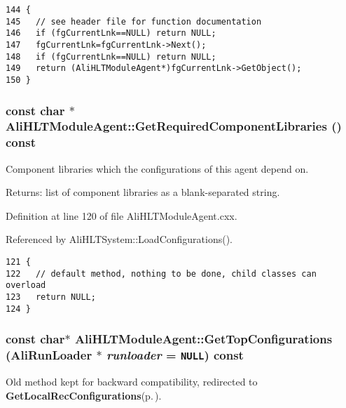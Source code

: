 \footnotesize\begin{verbatim}144 {
145   // see header file for function documentation
146   if (fgCurrentLnk==NULL) return NULL;
147   fgCurrentLnk=fgCurrentLnk->Next();
148   if (fgCurrentLnk==NULL) return NULL;
149   return (AliHLTModuleAgent*)fgCurrentLnk->GetObject();
150 }
\end{verbatim}\normalsize 


\subsubsection{\setlength{\rightskip}{0pt plus 5cm}const char $\ast$ Ali\-HLTModule\-Agent::Get\-Required\-Component\-Libraries () const\hspace{0.3cm}{\tt  [virtual]}}\label{classAliHLTModuleAgent_a7}


Component libraries which the configurations of this agent depend on. \begin{Desc}
\item[Returns:]list of component libraries as a blank-separated string. \end{Desc}


Definition at line 120 of file Ali\-HLTModule\-Agent.cxx.

Referenced by Ali\-HLTSystem::Load\-Configurations().

\footnotesize\begin{verbatim}121 {
122   // default method, nothing to be done, child classes can overload
123   return NULL;
124 }
\end{verbatim}\normalsize 


\subsubsection{\setlength{\rightskip}{0pt plus 5cm}const char$\ast$ Ali\-HLTModule\-Agent::Get\-Top\-Configurations (Ali\-Run\-Loader $\ast$ {\em runloader} = {\tt NULL}) const\hspace{0.3cm}{\tt  [inline]}}\label{classAliHLTModuleAgent_a9}


Old method kept for backward compatibility, redirected to {\bf Get\-Local\-Rec\-Configurations}{\rm (p.\,\pageref{classAliHLTModuleAgent_a5})}. 

